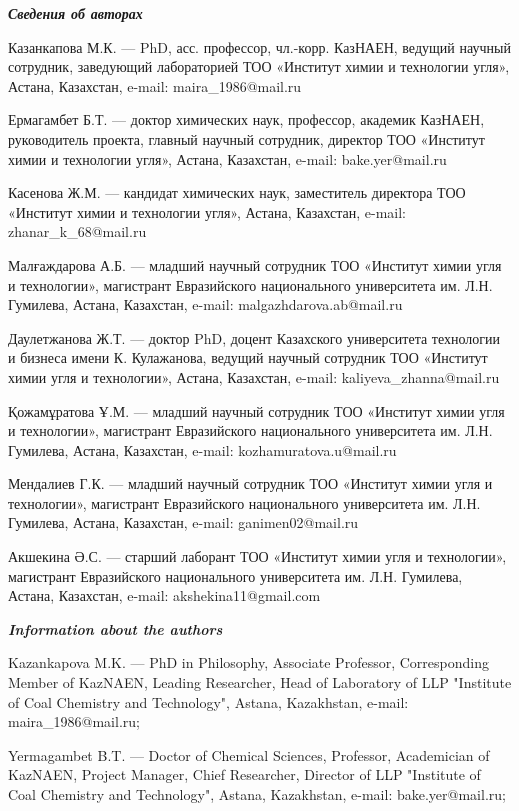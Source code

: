 \begin{authorinfo}
\hspace{1em}\emph{{\bfseries Сведения об авторах}}  

Казанкапова М.К. — PhD, асс. профессор, чл.-корр. КазНАЕН, ведущий
научный сотрудник, заведующий лабораторией ТОО «Институт химии и
технологии угля», Астана, Казахстан, e-mail: maira\_1986@mail.ru

Ермагамбет Б.Т. — доктор химических наук, профессор, академик КазНАЕН,
руководитель проекта, главный научный сотрудник, директор ТОО
«Институт химии и технологии угля», Астана, Казахстан, e-mail:
bake.yer@mail.ru

Касенова Ж.М. — кандидат химических наук, заместитель директора ТОО
«Институт химии и технологии угля», Астана, Казахстан, e-mail:
zhanar\_k\_68@mail.ru

Малғаждарова А.Б. — младший научный сотрудник ТОО «Институт химии угля
и технологии», магистрант Евразийского национального университета
им. Л.Н. Гумилева, Астана, Казахстан, e-mail: malgazhdarova.ab@mail.ru

Даулетжанова Ж.Т. — доктор PhD, доцент Казахского университета
технологии и бизнеса имени К. Кулажанова, ведущий научный сотрудник
ТОО «Институт химии угля и технологии», Астана, Казахстан, e-mail:
kaliyeva\_zhanna@mail.ru

Қожамұратова Ұ.М. — младший научный сотрудник ТОО «Институт химии угля
и технологии», магистрант Евразийского национального университета
им. Л.Н. Гумилева, Астана, Казахстан, e-mail: kozhamuratova.u@mail.ru

Мендалиев Г.К. — младший научный сотрудник ТОО «Институт химии угля и
технологии», магистрант Евразийского национального университета
им. Л.Н. Гумилева, Астана, Казахстан, e-mail: ganimen02@mail.ru

Акшекина Ә.С. — старший лаборант ТОО «Институт химии угля и
технологии», магистрант Евразийского национального университета
им. Л.Н. Гумилева, Астана, Казахстан, e-mail: akshekina11@gmail.com

\hspace{1em}\emph{{\bfseries Information about the authors}}  

Kazankapova M.K. — PhD in Philosophy, Associate Professor,
Corresponding Member of KazNAEN, Leading Researcher, Head of
Laboratory of LLP "Institute of Coal Chemistry and Technology",
Astana, Kazakhstan, e-mail: maira\_1986@mail.ru;

Yermagambet B.T. — Doctor of Chemical Sciences, Professor, Academician
of KazNAEN, Project Manager, Chief Researcher, Director of LLP
"Institute of Coal Chemistry and Technology", Astana, Kazakhstan,
e-mail: bake.yer@mail.ru;


\end{authorinfo}
